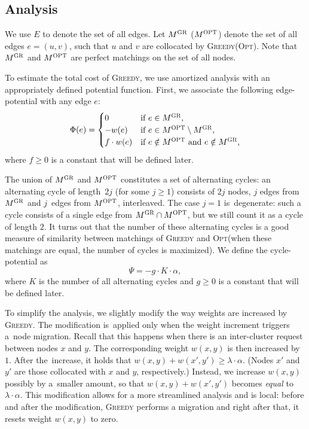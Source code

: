 \documentclass{siamart190516}
\newcommand{\GREEDY}{\textsc{Greedy}\xspace}
\newcommand{\MGREEDY}{M^\textsc{GR}}
\newcommand{\MOPT}{M^\textsc{OPT}}
\newcommand{\OPT}{\textsc{Opt}\xspace}
\begin{document}
\subsection{Analysis}

We use $E$ to denote the set of all edges.
Let $\MGREEDY$ ($\MOPT$) denote the set of all edges $e = (u,v)$, such 
that $u$ and $v$ are collocated by \GREEDY (\OPT). 
Note that $\MGREEDY$ and $\MOPT$ are perfect matchings on the set of all nodes.

To estimate the total cost of \GREEDY, we use amortized analysis with 
an appropriately defined potential function. First, 
we associate the following edge-potential with any edge $e$:
\[
	\Phi(e) = \begin{cases}
		0 			& \textrm{if $e \in \MGREEDY$,} \\
		- w(e) 	& \textrm{if $e \in \MOPT \setminus \MGREEDY$,} \\
		f \cdot w(e) & \textrm{if $e \notin \MOPT$ and $e \notin \MGREEDY$,} \\
	\end{cases}
\]
where $f \geq 0$ is a constant that will be defined later. 

The union of $\MGREEDY$ and $\MOPT$ constitutes a set of alternating cycles:
an alternating cycle of length~$2 j$ (for some $j \geq 1$) consists of $2 j$
nodes, $j$ edges from $\MGREEDY$ and $j$~edges from $\MOPT$, interleaved. The
case $j = 1$ is~degenerate: such a cycle consists of a single edge from $\MGREEDY
\cap \MOPT$, but we still count it as a cycle of length $2$. 
It turns out that the number of these alternating cycles is a good measure of 
similarity between matchings of \GREEDY and \OPT (when these matchings are 
equal, the number of cycles is maximized). We define the
cycle-potential as
\[
	\Psi = - g \cdot K \cdot \alpha,
\]
where $K$ is the number of all alternating cycles and $g \geq 0$ is a constant that will
be defined later.

To simplify the analysis, we slightly modify the way weights are increased by
\GREEDY. The modification is~applied only when the weight increment triggers 
a~node migration. Recall that this happens when there is an inter-cluster
request between nodes $x$ and $y$. The corresponding weight $w(x,y)$ is then
increased by $1$. After the~increase, it holds that $w(x,y) + w(x',y') \geq
\lambda \cdot \alpha$. (Nodes $x'$ and $y'$ are those collocated with $x$ and $y$,
respectively.) Instead, we increase $w(x,y)$ possibly by a~smaller amount, so
that $w(x,y) + w(x',y')$ becomes \emph{equal} to $\lambda \cdot \alpha$. This
modification allows for a more streamlined analysis and is local: before and
after the modification, \GREEDY performs a migration and right after that, 
it resets weight $w(x,y)$ to zero.
\end{document}
